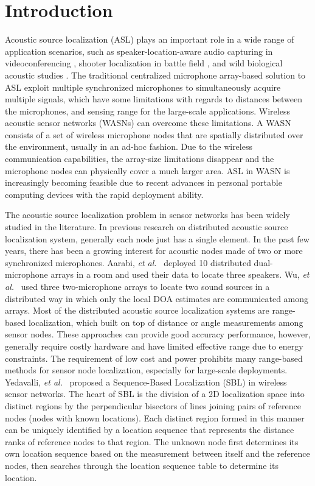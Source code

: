 
\section{Introduction}

Acoustic source localization (ASL) plays an important role in a wide range of application scenarios, such
as speaker-location-aware audio capturing in videoconferencing \cite{guo2011localising}, shooter localization in battle field \cite{sallai2011acoustic}, and wild biological acoustic studies \cite{allen2008voxnet}. 
The traditional centralized microphone array-based solution to ASL exploit multiple synchronized microphones to simultaneously acquire multiple signals, which have some limitations with regards to distances between the microphones, and sensing range for the large-scale applications.
Wireless acoustic sensor networks (WASNs) can overcome these limitations. 
A WASN consists of a set of wireless microphone nodes that are spatially distributed over the environment, usually in an ad-hoc fashion. 
Due to the wireless communication capabilities, the array-size limitations disappear and the microphone nodes can physically cover a much larger area. 
ASL in WASN is increasingly becoming feasible due to recent advances in personal portable computing devices with the rapid deployment ability.

The acoustic source localization problem in sensor networks has been widely studied in the literature. 
In previous research on distributed acoustic source localization system, generally each node just has a single element. 
In the past few years, there has been a growing interest for acoustic nodes made of two or more synchronized microphones. 
Aarabi, \emph{et al.}~\cite{aarabi1900fusion} deployed 10 distributed dual-microphone arrays in a room and used their data to locate three speakers. 
Wu, \emph{et al.}~\cite{wu2012fusion} used three two-microphone arrays to locate two sound sources in a distributed way in which only the local DOA estimates are communicated among arrays.
Most of the distributed acoustic source localization systems are range-based localization, which built on top of distance or angle measurements among sensor nodes. 
These approaches can provide good accuracy performance, however, generally require costly hardware and have limited effective range due to energy constraints. 
The requirement of low cost and power prohibits many range-based methods for sensor node localization, especially for large-scale deployments. 
Yedavalli, \emph{et al.}~\cite{yedavalli2008sequence} proposed a Sequence-Based Localization (SBL) in wireless sensor networks. The heart of SBL is the division of a 2D localization space into distinct regions by the perpendicular bisectors of lines joining pairs of reference nodes (nodes with known locations).
Each distinct region formed in this manner can be uniquely identified by a location sequence that represents the distance ranks of reference nodes to that region. 
The unknown node first determines its own location sequence based on the measurement between itself and the reference nodes, then searches through the location sequence table to determine its location.

